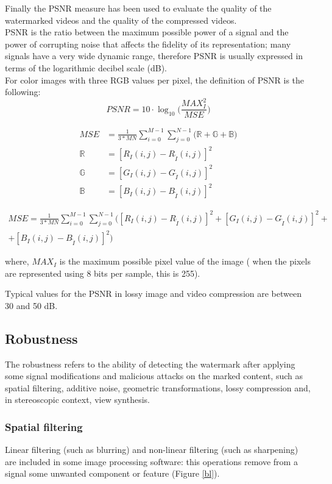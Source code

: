 Finally the PSNR measure has been used to evaluate the quality of the watermarked videos and the quality of the compressed videos.\\
PSNR is the ratio between the maximum possible power of a signal and the power of corrupting noise that affects the fidelity of its representation; many signals have a very wide dynamic range, therefore PSNR is usually expressed in terms of the logarithmic decibel scale (dB). \\
For color images with three RGB values per pixel, the definition of PSNR is the following:
\begin{equation}
PSNR = 10 \cdot \log_{10}\bigg( \frac{MAX_{I}^2}{MSE}\bigg)
\end{equation}

\begin{align}
MSE & = \frac{1}{3*MN} \sum_{i=0}^{M-1}\sum_{j=0}^{N-1}\Big(\mathbb{R} +\mathbb{G} + \mathbb{B}  \Big) \\
\mathbb{R} &= [R_{I}(i,j)-R_{\tilde{I}}(i,j)]^{2} \\
\mathbb{G} &= [G_{I}(i,j)-G_{\tilde{I}}(i,j)]^{2} \\
\mathbb{B} &= [B_{I}(i,j)-B_{\tilde{I}}(i,j)]^{2}
\end{align}

\begin{multline}
MSE  = \frac{1}{3*MN} \sum_{i=0}^{M-1}\sum_{j=0}^{N-1}\Big([R_{I}(i,j)-R_{\tilde{I}}(i,j)]^{2} +[G_{I}(i,j)-G_{\tilde{I}}(i,j)]^{2} + \\
+ [B_{I}(i,j)-B_{\tilde{I}}(i,j)]^{2} \Big) 
\end{multline}

where, $MAX_{I}$ is the maximum possible pixel value of the image ( when the pixels are represented using 8 bits per sample, this is 255). 


Typical values for the PSNR in lossy image and video compression are between 30 and 50 dB.

\subsection{Robustness}
The robustness refers to the ability of detecting the watermark after applying some signal modifications
and malicious attacks on the marked content, such as spatial filtering, additive noise, geometric  transformations, lossy compression and, in stereoscopic context, view synthesis.

\subsubsection{Spatial filtering}
Linear filtering (such as blurring) and non-linear filtering (such as sharpening) are included in some image processing software: this operations remove from a signal some unwanted component or feature (Figure \ref{bl}).

